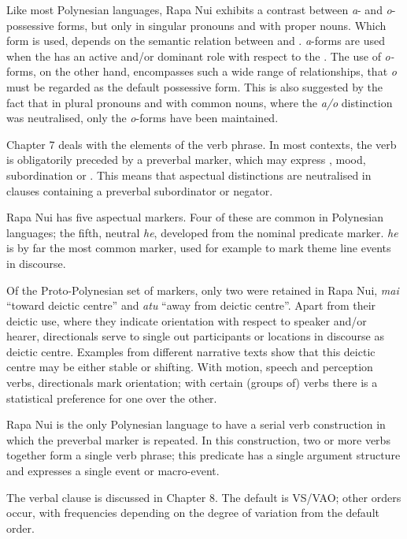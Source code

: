 Like most Polynesian languages, Rapa Nui exhibits a contrast between \textit{a}{}- and \textit{o}{}-possessive forms, but only in singular pronouns and with proper nouns. Which form is used, depends on the semantic relation between  and . \textit{a}{}-forms are used when the  has an active and/or dominant role with respect to the . The use of \textit{o-}forms, on the other hand, encompasses such a wide range of relationships, that \textit{o} must be regarded as the default possessive form. This is also suggested by the fact that in plural pronouns and with common nouns, where the \textit{a/o} distinction was neutralised, only the \textit{o}{}-forms have been maintained.

\medskip Chapter 7 deals with the elements of the verb phrase. In most contexts, the verb is obligatorily preceded by a preverbal marker, which may express , mood, subordination or . This means that aspectual distinctions are neutralised in clauses containing a preverbal subordinator or negator. 

Rapa Nui has five aspectual markers. Four of these are common in Polynesian languages; the fifth, neutral \textit{he}, developed from the nominal predicate marker. \textit{he} is by far the most common  marker, used for example to mark theme line events in discourse.

Of the Proto-Polynesian set of  markers, only two were retained in Rapa Nui, \textit{mai} “toward deictic centre” and \textit{atu} “away from deictic centre”. Apart from their deictic use, where they indicate orientation with respect to speaker and/or hearer, directionals serve to single out participants or locations in discourse as deictic centre. Examples from different narrative texts show that this deictic centre may be either stable or shifting. With motion, speech and perception verbs, directionals mark orientation; with certain (groups of) verbs there is a statistical preference for one  over the other.

Rapa Nui is the only Polynesian language to have a serial verb construction in which the preverbal marker is repeated. In this construction, two or more verbs together form a single verb phrase; this predicate has a single argument structure and expresses a single event or macro-event.

\medskip The verbal clause is discussed in Chapter 8. The default  is VS/VAO; other orders occur, with frequencies depending on the degree of variation from the default order.

